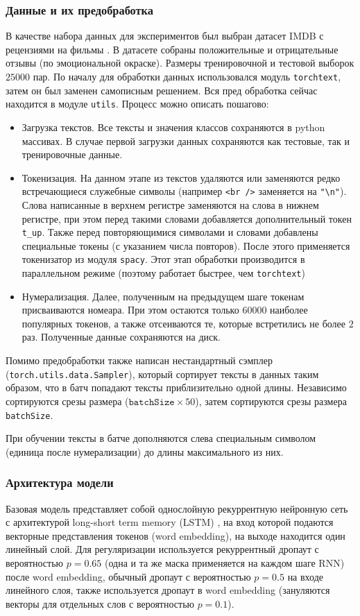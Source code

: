 \documentclass[12pt]{article}
\begin{document}
\subsubsection*{Данные и их предобработка}
В качестве набора данных для экспериментов был выбран датасет IMDB с рецензиями на фильмы \cite{maas-EtAl:2011:ACL-HLT2011}. В датасете собраны положительные
и отрицательные отзывы (по эмоциональной окраске). Размеры тренировочной и тестовой выборок $25000$ пар. По началу для обработки данных использовался
модуль \texttt{torchtext}, затем он был заменен самописным решением. Вся пред обработка сейчас находится в модуле \texttt{utils}. Процесс можно описать пошагово:
\begin{itemize}
  \item
  Загрузка текстов. Все тексты и значения классов сохраняются в python массивах. В случае первой загрузки данных
  сохраняются как тестовые, так и тренировочные данные.
  \item
    Токенизация. На данном этапе из текстов удаляются или заменяются редко встречающиеся служебные символы (например \texttt{<br />} заменяется на \texttt{"\textbackslash n"}).
    Слова написанные в верхнем регистре заменяются на слова в нижнем регистре, при этом перед такими словами добавляется дополнительный токен \texttt{t\_up}. Также перед повторяющимися
    символами и словами добавлены специальные токены (с указанием числа повторов). После этого применяется токенизатор из модуля \texttt{spacy}. Этот этап обработки производится в параллельном 
    режиме (поэтому работает быстрее, чем \texttt{torchtext})
  \item Нумерализация. Далее, полученным на предыдущем шаге токенам присваиваются номеара. При этом остаются только
  $60000$ наиболее популярных токенов, а также отсеиваются те, которые встретились не более $2$ раз. Полученные данные сохраняются на диск.
\end{itemize}
Помимо предобработки также написан нестандартный сэмплер (\texttt{torch.utils.data.Sampler}), который сортирует тексты в данных таким образом, что в батч попадают тексты
приблизительно одной длины. Независимо сортируются срезы размера ($\mathtt{batchSize} \times 50$), затем сортируются срезы размера \texttt{batchSize}.

При обучении тексты в батче дополняются слева специальным символом (единица после нумерализации) до длины максимального из них.
\subsubsection*{Архитектура модели}
Базовая модель представляет собой однослойную рекуррентную нейронную сеть с архитектурой long-short term memory (LSTM) \cite{Hochreiter:1997:LSM:1246443.1246450}, на вход которой подаются векторные представления
токенов (word embedding), на выходе находится один линейный слой. Для регуляризации используется рекуррентный дропаут \cite{1512.05287} с вероятностью $p=0.65$ (одна и та же маска применяется на каждом шаге RNN) после word embedding,
обычный дропаут \cite{JMLR:v15:srivastava14a} с вероятностью $p=0.5$ на входе линейного слоя, также используется дропаут в word embedding \cite{1512.05287} (зануляются векторы для отдельных слов с вероятностью $p=0.1$).
\end{document}
